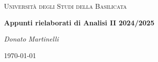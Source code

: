 \documentclass{article}
\theoremstyle{plain}
\theoremstyle{definition}
\theoremstyle{remark}
\begin{document}
\begin{titlepage}
    \centering
	{\textsc{Università degli Studi della Basilicata} \par}
	\vspace{2cm}
    {\huge\bfseries Appunti rielaborati di Analisi II 2024/2025\par}
    \vfill
	{\Large\itshape Donato Martinelli\par}
	{\large \today\par}
\end{titlepage}

\newpage 

% 
% 
% 
% 
% 
% 
% 
% 
% 
% 
\end{document}
